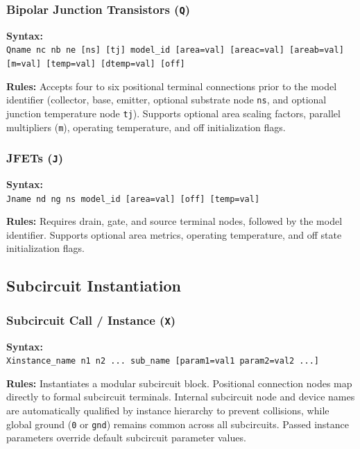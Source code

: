 \subsubsection{Bipolar Junction Transistors (\texttt{Q})}
\begin{compactitem}
    \item \textbf{Syntax:} \\
    \texttt{Qname nc nb ne [ns] [tj] model\_id [area=val] [areac=val] [areab=val] [m=val] [temp=val] [dtemp=val] [off]}
    \item \textbf{Rules:} Accepts four to six positional terminal connections prior to the model identifier (collector, base, emitter, optional substrate node \texttt{ns}, and optional junction temperature node \texttt{tj}). Supports optional area scaling factors, parallel multipliers (\texttt{m}), operating temperature, and off initialization flags.
\end{compactitem}

\subsubsection{JFETs (\texttt{J})}
\begin{compactitem}
    \item \textbf{Syntax:} \\
    \texttt{Jname nd ng ns model\_id [area=val] [off] [temp=val]}
    \item \textbf{Rules:} Requires drain, gate, and source terminal nodes, followed by the model identifier. Supports optional area metrics, operating temperature, and off state initialization flags.
\end{compactitem}

\subsection{Subcircuit Instantiation}

\subsubsection{Subcircuit Call / Instance (\texttt{X})}
\begin{compactitem}
    \item \textbf{Syntax:} \\
    \texttt{Xinstance\_name n1 n2 ... sub\_name [param1=val1 param2=val2 ...]}
    \item \textbf{Rules:} Instantiates a modular subcircuit block. Positional connection nodes map directly to formal subcircuit terminals. Internal subcircuit node and device names are automatically qualified by instance hierarchy to prevent collisions, while global ground (\texttt{0} or \texttt{gnd}) remains common across all subcircuits. Passed instance parameters override default subcircuit parameter values.
\end{compactitem}

